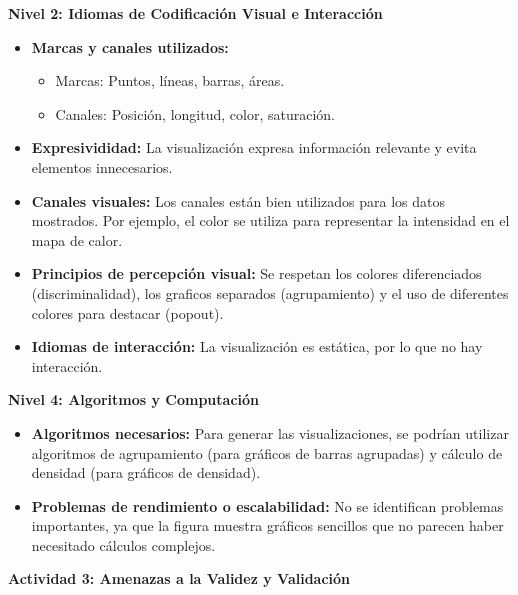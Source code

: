 \textbf{Nivel 2: Idiomas de Codificación Visual e Interacción}
\begin{itemize}[label=\textbullet]
    \item \textbf{Marcas y canales utilizados:}
        \begin{itemize}[label=\textbullet]
            \item Marcas: Puntos, líneas, barras, áreas.
            \item Canales: Posición, longitud, color, saturación.
        \end{itemize}
    \item \textbf{Expresivididad:} La visualización expresa información relevante y evita elementos innecesarios.
    \item \textbf{Canales visuales:} Los canales están bien utilizados para los datos mostrados. Por ejemplo, el color se utiliza para representar la intensidad en el mapa de calor.
    \item \textbf{Principios de percepción visual:} Se respetan los colores diferenciados (discriminalidad), los graficos separados (agrupamiento) y el uso de diferentes colores para destacar (popout).
    \item \textbf{Idiomas de interacción:} La visualización es estática, por lo que no hay interacción. 
\end{itemize}
\textbf{Nivel 4: Algoritmos y Computación}
\begin{itemize}[label=\textbullet]
    \item \textbf{Algoritmos necesarios:} Para generar las visualizaciones, se podrían utilizar algoritmos de agrupamiento (para gráficos de barras agrupadas) y cálculo de densidad (para gráficos de densidad).
    \item \textbf{Problemas de rendimiento o escalabilidad:} No se identifican problemas importantes, ya que la figura muestra gráficos sencillos que no parecen haber necesitado cálculos complejos. 
\end{itemize}
\textbf{\Large Actividad 3: Amenazas a la Validez y Validación}

